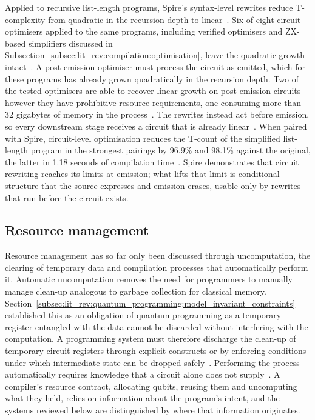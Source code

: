 Applied to recursive list-length programs, Spire's syntax-level rewrites reduce T-complexity from quadratic in the recursion depth to linear~\cite{yuan2025foundationalabstractions}.
Six of eight circuit optimisers applied to the same programs, including verified optimisers and ZX-based simplifiers discussed in Subsection~\ref{subsec:lit_rev:compilation:optimisation}, leave the quadratic growth intact~\cite{yuan2025foundationalabstractions}.
A post-emission optimiser must process the circuit as emitted, which for these programs has already grown quadratically in the recursion depth.
Two of the tested optimisers are able to recover linear growth on post emission circuits however they have prohibitive resource requirements, one consuming more than 32 gigabytes of memory in the process~\cite{yuan2025foundationalabstractions}.
The rewrites instead act before emission, so every downstream stage receives a circuit that is already linear~\cite{yuan2025foundationalabstractions}.
When paired with Spire, circuit-level optimisation reduces the T-count of the simplified list-length program in the strongest pairings by 96.9\% and 98.1\% against the original, the latter in 1.18 seconds of compilation time~\cite{yuan2025foundationalabstractions}.
Spire demonstrates that circuit rewriting reaches its limits at emission; what lifts that limit is conditional structure that the source expresses and emission erases, usable only by rewrites that run before the circuit exists.

\subsection{Resource management}\label{subsec:lit_rev:compilation:resource_management}
Resource management has so far only been discussed through uncomputation, the clearing of temporary data and compilation processes that automatically perform it.
Automatic uncomputation removes the need for programmers to manually manage clean-up analogous to garbage collection for classical memory.
Section~\ref{subsec:lit_rev:quantum_programming:model_invariant_constraints} established this as an obligation of quantum programming as a temporary register entangled with the data cannot be discarded without interfering with the computation.
A programming system must therefore discharge the clean-up of temporary circuit registers through explicit constructs or by enforcing conditions under which intermediate state can be dropped safely~\cite{bichsel2020silq}.
Performing the process automatically requires knowledge that a circuit alone does not supply~\cite{paradis2021unqomp}.
A compiler's resource contract, allocating qubits, reusing them and uncomputing what they held, relies on information about the program's intent, and the systems reviewed below are distinguished by where that information originates.


